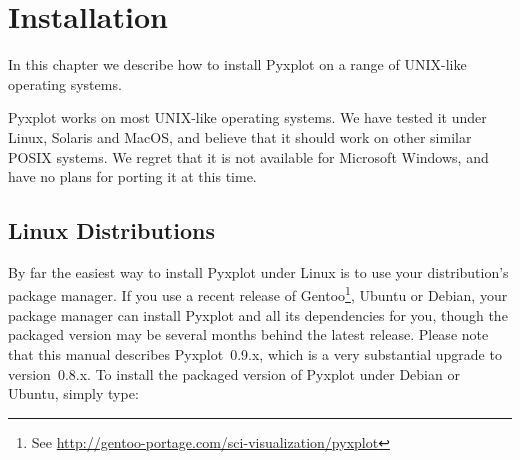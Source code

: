 %
%
%
%
%



\chapter{Installation}

\label{ch:installation}

In this chapter we describe how to install Pyxplot on a range of UNIX-like
operating systems.

Pyxplot works on most UNIX-like operating systems. We have tested it under
Linux, Solaris and MacOS, and believe that it
should work on other similar POSIX systems. We regret that it is not available
for Microsoft Windows, and have no plans for porting it at this time.

\section{Linux Distributions}

By far the easiest way to install Pyxplot under Linux is to use your
distribution's package manager.  If you use a recent release of
Gentoo\footnote{See
\url{http://gentoo-portage.com/sci-visualization/pyxplot}}, Ubuntu or Debian, your package manager can
install Pyxplot and all its dependencies for you, though the packaged version
may be several months behind the latest release. Please note that this manual
describes Pyxplot~0.9.x, which is a very substantial upgrade to version~0.8.x.
To install the packaged version of Pyxplot under Debian or Ubuntu, simply type:

